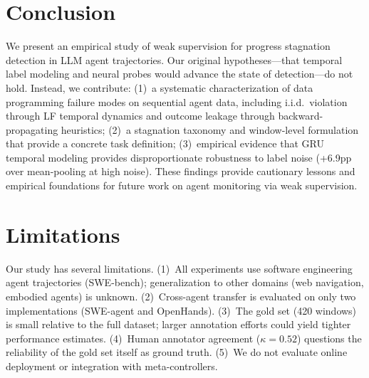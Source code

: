 \documentclass[11pt,a4paper]{article}
\begin{document}
\section{Conclusion}

We present an empirical study of weak supervision for progress stagnation detection in LLM agent trajectories.
Our original hypotheses---that temporal label modeling and neural probes would advance the state of detection---do not hold.
Instead, we contribute:
(1)~a systematic characterization of data programming failure modes on sequential agent data, including i.i.d.\ violation through LF temporal dynamics and outcome leakage through backward-propagating heuristics;
(2)~a stagnation taxonomy and window-level formulation that provide a concrete task definition;
(3)~empirical evidence that GRU temporal modeling provides disproportionate robustness to label noise (+6.9pp over mean-pooling at high noise).
These findings provide cautionary lessons and empirical foundations for future work on agent monitoring via weak supervision.

\section*{Limitations}

Our study has several limitations.
(1)~All experiments use software engineering agent trajectories (SWE-bench); generalization to other domains (web navigation, embodied agents) is unknown.
(2)~Cross-agent transfer is evaluated on only two implementations (SWE-agent and OpenHands).
(3)~The gold set (420 windows) is small relative to the full dataset; larger annotation efforts could yield tighter performance estimates.
(4)~Human annotator agreement ($\kappa{=}0.52$) questions the reliability of the gold set itself as ground truth.
(5)~We do not evaluate online deployment or integration with meta-controllers.
\end{document}
